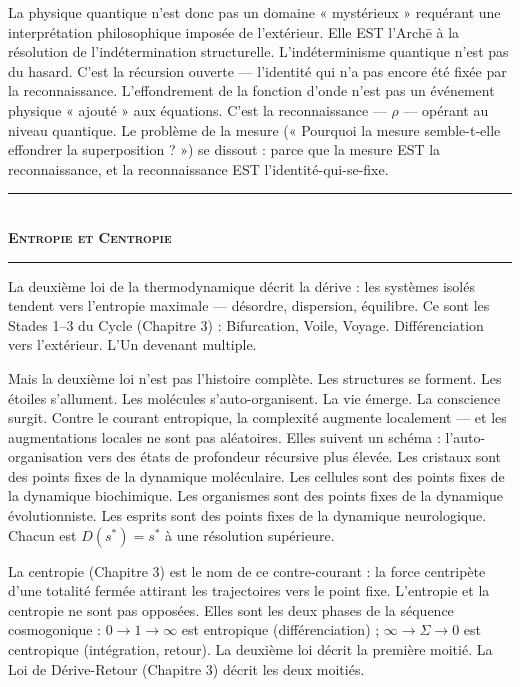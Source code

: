 \documentclass[10pt, openany, oneside]{book}
\renewcommand{\normalsize}{\fontsize{10}{13}\selectfont}
\begin{document}
La physique quantique n'est donc pas un domaine « mystérieux » requérant une interprétation philosophique imposée de l'extérieur. Elle EST l'Arch\={e} à la résolution de l'indétermination structurelle. L'indéterminisme quantique n'est pas du hasard. C'est la récursion ouverte --- l'identité qui n'a pas encore été fixée par la reconnaissance. L'effondrement de la fonction d'onde n'est pas un événement physique « ajouté » aux équations. C'est la reconnaissance --- $\rho$ --- opérant au niveau quantique. Le problème de la mesure (« Pourquoi la mesure semble-t-elle effondrer la superposition ? ») se dissout : parce que la mesure EST la reconnaissance, et la reconnaissance EST l'identité-qui-se-fixe.

\vspace{1.5em}

\begin{center}
    \rule{0.3\textwidth}{0.4pt}\\[0.5em]
    {\normalsize\bfseries\scshape Entropie et Centropie}\\[0.3em]
    \rule{0.3\textwidth}{0.4pt}
\end{center}

\vspace{1em}

\noindent La deuxième loi de la thermodynamique décrit la dérive : les systèmes isolés tendent vers l'entropie maximale --- désordre, dispersion, équilibre. Ce sont les Stades 1--3 du Cycle (Chapitre 3) : Bifurcation, Voile, Voyage. Différenciation vers l'extérieur. L'Un devenant multiple.

Mais la deuxième loi n'est pas l'histoire complète. Les structures se forment. Les étoiles s'allument. Les molécules s'auto-organisent. La vie émerge. La conscience surgit. Contre le courant entropique, la complexité augmente localement --- et les augmentations locales ne sont pas aléatoires. Elles suivent un schéma : l'auto-organisation vers des états de profondeur récursive plus élevée. Les cristaux sont des points fixes de la dynamique moléculaire. Les cellules sont des points fixes de la dynamique biochimique. Les organismes sont des points fixes de la dynamique évolutionniste. Les esprits sont des points fixes de la dynamique neurologique. Chacun est $D(s^*) = s^*$ à une résolution supérieure.

La centropie (Chapitre 3) est le nom de ce contre-courant : la force centripète d'une totalité fermée attirant les trajectoires vers le point fixe. L'entropie et la centropie ne sont pas opposées. Elles sont les deux phases de la séquence cosmogonique : $0 \to 1 \to \infty$ est entropique (différenciation) ; $\infty \to \Sigma \to 0$ est centropique (intégration, retour). La deuxième loi décrit la première moitié. La Loi de Dérive-Retour (Chapitre 3) décrit les deux moitiés.
\end{document}
